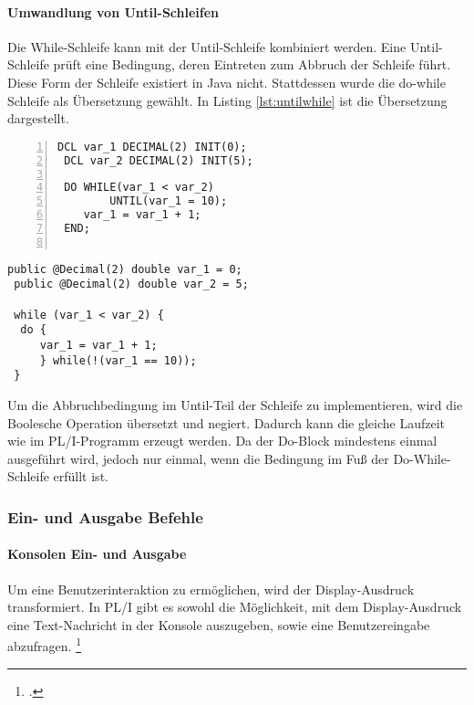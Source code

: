 \pagebreak
\paragraph*{Umwandlung von Until-Schleifen}

Die While-Schleife kann mit der Until-Schleife kombiniert werden. Eine Until-Schleife prüft eine Bedingung, deren Eintreten zum Abbruch der Schleife führt. Diese Form der Schleife existiert in Java nicht. Stattdessen wurde die do-while Schleife als Übersetzung gewählt. In Listing \ref{lst:untilwhile} ist die Übersetzung dargestellt.

\begin{minipage}[b]{0.48\linewidth}
	\centering
	\lstset{language=PL/I,label=SliceExaple}
	\begin{lstlisting}[frame=single, numbers=left, mathescape,%
		caption={Transformation Until-Schleife}, label={lst:untilwhile}, basicstyle=\fontsize{9}{13}\selectfont\ttfamily]
 DCL var_1 DECIMAL(2) INIT(0);
 DCL var_2 DECIMAL(2) INIT(5);
		
 DO WHILE(var_1 < var_2) 
		UNTIL(var_1 = 10);
 	var_1 = var_1 + 1;
 END;
		
	\end{lstlisting}
\end{minipage}
\hspace{0.5cm}
\begin{minipage}[b]{0.48\linewidth}
	\centering
	\lstset{language=Java,label=SliceExaple}
	\begin{lstlisting}[frame=single, mathescape,%
		title={" "}, basicstyle=\fontsize{9}{13}\selectfont\ttfamily]
 public @Decimal(2) double var_1 = 0;
 public @Decimal(2) double var_2 = 5;
		
 while (var_1 < var_2) {
  do {
	 var_1 = var_1 + 1;
	 } while(!(var_1 == 10));
 }
	\end{lstlisting}
\end{minipage} 

Um die Abbruchbedingung im Until-Teil der Schleife zu implementieren, wird die Boolesche Operation übersetzt und negiert. Dadurch kann die gleiche Laufzeit wie im PL/I-Programm erzeugt werden. Da der Do-Block mindestens einmal ausgeführt wird, jedoch nur einmal, wenn die Bedingung im Fuß der Do-While-Schleife erfüllt ist.

\subsubsection{Ein- und Ausgabe Befehle}
\paragraph*{Konsolen Ein- und Ausgabe}
Um eine Benutzerinteraktion zu ermöglichen, wird der Display-Ausdruck transformiert.
In PL/I gibt es sowohl die Möglichkeit, mit dem Display-Ausdruck eine Text-Nachricht in der Konsole auszugeben, sowie eine Benutzereingabe abzufragen. \footcite[Vgl. ][S. 264ff.]{pliref}

